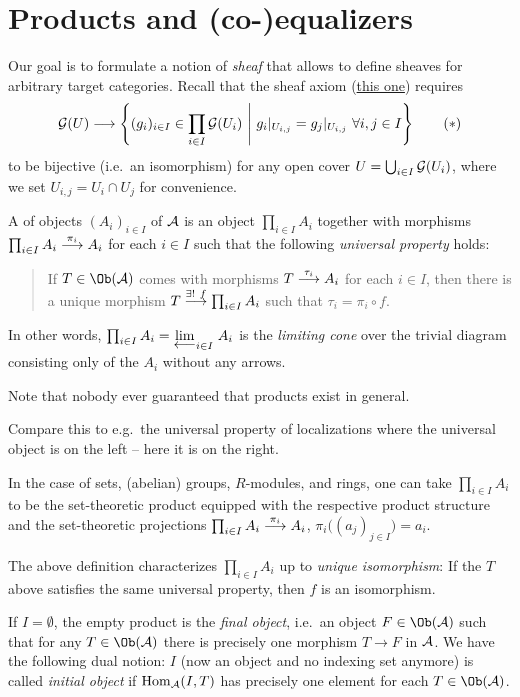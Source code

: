 \documentclass[a4paper,parskip=half,numbers=enddot, DIV=12]{scrreprt}
\begin{document}
  \section{Products and (co-)equalizers}
  Our goal is to formulate a notion of \emph{sheaf} that allows to define sheaves for arbitrary target categories. Recall that the sheaf axiom (\hyperref[sheafAxiom]{this one}) requires
  \begin{align}\lbl{eq:sheafAxiom}
  	\Gg(U)\longrightarrow\left\{(g_i)_{i\in I}\in\prod_{i\in I}\Gg(U_i)\st g_i|_{U_{i,j}}=g_j|_{U_{i,j}}\ \forall i,j\in I\right\}\tag{$*$}
  \end{align}
  to be bijective (i.e.\ an isomorphism) for any open cover $U=\bigcup_{i\in I}\mathcal{G}(U_i)$, where we set $U_{i,j}=U_i\cap U_j$ for convenience.
  
  \begin{defi}[Products]
  	A  of objects $(A_i)_{i\in I}$ of $\mathcal{A}$ is an object $\prod_{i\in I}A_i$ together with morphisms $\prod_{i\in I}A_i\morphism[\pi_i]A_i$ for each $i\in I$ such that the following \emph{universal property} holds:
  	\begin{quote}
  		If $T\in\Ob(\Aa)$ comes with morphisms $T\morphism[\tau_i]A_i$ for each $i\in I$, then there is a unique morphism $T\morphism[\exists!\ f]\prod_{i\in I}A_i$ such that $\tau_i=\pi_i\circ f$.
  	\end{quote}
  	In other words, $\prod_{i\in I}A_i=\limit[i\in I]{A_i}$ is the \emph{limiting cone} over the trivial diagram consisting only of the $A_i$ without any arrows.
  \end{defi}
  Note that nobody ever guaranteed that products exist in general.
  \begin{rem*}
  	\begin{alphanumerate}
  		\item Compare this to e.g.\ the universal property of localizations where the universal object is on the left -- here it is on the right.
  		\item In the case of sets, (abelian) groups, $R$-modules, and rings, one can take $\prod_{i\in I}A_i$ to be the set-theoretic product equipped with the respective product structure and the set-theoretic projections $\prod_{i\in I}A_i\morphism[\pi_i]A_i$, $\pi_i\big((a_j)_{j\in I}\big)=a_i$.
  		\item The above definition characterizes $\prod_{i\in I}A_i$ up to \emph{unique isomorphism}: If the $T$ above satisfies the same universal property, then $f$ is an isomorphism.
  		\item If $I=\emptyset$, the empty product is the \emph{final object}, i.e.\ an object $F\in\Ob(\Aa)$ such that for any $T\in\Ob(\Aa)$ there is precisely one morphism $T\to F$ in $\mathcal{A}$. We have the following dual notion: $I$ (now an object and no indexing set anymore) is called \emph{initial object} if $\operatorname{Hom}_{\mathcal{A}}(I,T)$ has precisely one element for each $T\in\Ob(\Aa)$.
  	\end{alphanumerate}
  \end{rem*}
\end{document}
